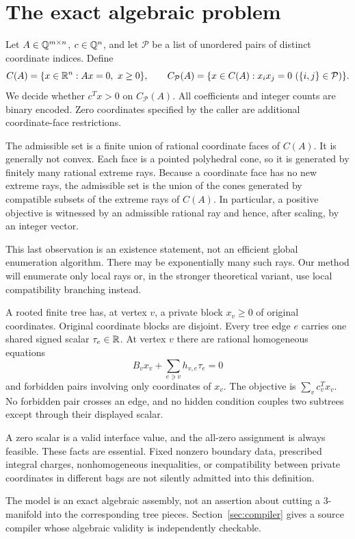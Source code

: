 \section{The exact algebraic problem}
\label{sec:problem}

Let $A\in\mathbb Q^{m\times n}$, $c\in\mathbb Q^n$, and let $\mathcal P$ be a list of
unordered pairs of distinct coordinate indices. Define
\[
 C(A)=\{x\in\mathbb R^n:Ax=0,\ x\geq0\},\qquad
 C_{\mathcal P}(A)=\{x\in C(A):x_ix_j=0\ (\{i,j\}\in\mathcal P)\}.
\]
We decide whether $c^Tx>0$ on $C_{\mathcal P}(A)$.
All coefficients and integer counts are binary encoded. Zero coordinates
specified by the caller are additional coordinate-face restrictions.

The admissible set is a finite union of rational coordinate faces of $C(A)$.
It is generally not convex. Each face is a pointed polyhedral cone, so it is
generated by finitely many rational extreme rays. Because a coordinate face
has no new extreme rays, the admissible set is the union of the cones generated
by compatible subsets of the extreme rays of $C(A)$. In particular, a positive
objective is witnessed by an admissible rational ray and hence, after scaling,
by an integer vector.

This last observation is an existence statement, not an efficient global
enumeration algorithm. There may be exponentially many such rays. Our method
will enumerate only local rays or, in the stronger theoretical variant, use
local compatibility branching instead.

\begin{definition}
A rooted finite tree has, at vertex $v$, a private block $x_v\geq0$ of original
coordinates. Original coordinate blocks are disjoint. Every tree edge $e$
carries one shared signed scalar $\tau_e\in\mathbb R$. At vertex $v$ there are rational
homogeneous equations
\[
 B_vx_v+\sum_{e\ni v}h_{v,e}\tau_e=0
\]
and forbidden pairs involving only coordinates of $x_v$. The objective is
$\sum_v c_v^Tx_v$. No forbidden pair crosses an edge, and no hidden condition
couples two subtrees except through their displayed scalar.
\end{definition}

A zero scalar is a valid interface value, and the all-zero assignment is always
feasible. These facts are essential. Fixed nonzero boundary data, prescribed
integral charges, nonhomogeneous inequalities, or compatibility between private
coordinates in different bags are not silently admitted into this definition.

The model is an exact algebraic assembly, not an assertion about cutting a
3-manifold into the corresponding tree pieces. Section~\ref{sec:compiler}
gives a source compiler whose algebraic validity is independently checkable.
